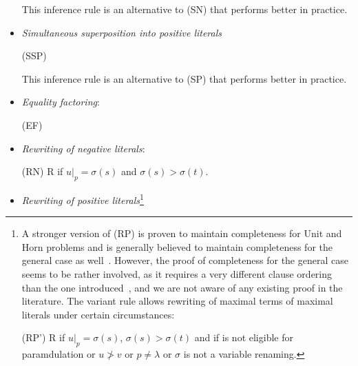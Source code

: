 \documentclass{report}
\begin{document}
\begin{definition}
\begin{itemize}
   This inference rule is an alternative to (SN) that performs better
   in practice.

\item \emph{Simultaneous superposition into positive literals}

  \bigskip (SSP) 

  This inference rule is an alternative to (SP) that performs better
  in practice.

 \item \emph{Equality factoring}:

   \bigskip (EF) 


 \item \emph{Rewriting of negative literals}:

   \bigskip (RN)  {
     \phantom{ae}  \vee R} {if
     $u|_p = \sigma(s)$ and $\sigma(s)>\sigma(t)$.}


 \item \emph{Rewriting of positive
     literals}\footnote{A stronger version of (RP)
     is proven to maintain completeness for Unit and Horn problems
     and is generally believed to maintain completeness for the
     general case as well~\cite{Bachmair:personal-98}.  However, the
     proof of completeness for the general case seems to be rather
     involved, as it requires a very different clause ordering than
     the one introduced~\cite{BG94}, and we are not aware of any
     existing proof in the literature. The variant rule allows
     rewriting of maximal terms of maximal literals under certain
     circumstances:

     \medskip
     (RP')  {
       \phantom{ae}  \vee R} {if
       $u|_p = \sigma(s)$, $\sigma(s)>\sigma(t)$ and
       if  is not eligible for
       paramdulation or $u \not> v$ or $p \not=
       \lambda$ or $\sigma$ is not a variable renaming.}

}
\end{itemize}
\end{definition}
\end{document}
